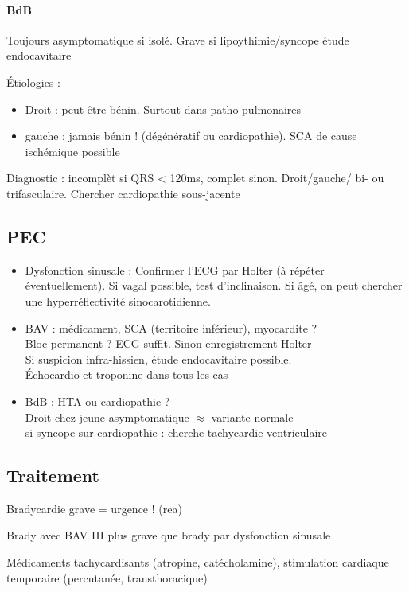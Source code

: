 \paragraph{BdB}
Toujours asymptomatique si isolé. Grave si lipoythimie/syncope \danger \thus
étude endocavitaire

Étiologies :
\begin{itemize}
  \item Droit : peut être bénin. Surtout dans patho pulmonaires
  \item gauche : jamais bénin ! (dégénératif ou cardiopathie). SCA de cause
    ischémique possible \skull
\end{itemize}

Diagnostic : incomplèt si QRS < 120ms, complet sinon. Droit/gauche/ bi- ou
trifasculaire. Chercher cardiopathie sous-jacente

\subsection{PEC}
\begin{itemize}
  \item 
Dysfonction sinusale : Confirmer l'ECG par Holter (à répéter éventuellement).
Si vagal possible, test d'inclinaison. Si âgé, on peut chercher une
hyperréflectivité sinocarotidienne.
\item BAV : médicament, SCA (territoire inférieur), myocardite ? \\
  Bloc permanent ? ECG suffit. Sinon enregistrement Holter \\
  Si suspicion infra-hissien, étude endocavitaire possible.\\
  Échocardio et troponine dans tous les cas
\item BdB : HTA ou cardiopathie ?\\
  Droit chez jeune asymptomatique $\approx$ variante normale\\
  si syncope sur cardiopathie : cherche tachycardie ventriculaire
\end{itemize}

\subsection{Traitement}
Bradycardie grave = urgence ! (rea) \skull

Brady avec BAV III plus grave que brady par dysfonction sinusale

Médicaments tachycardisants (atropine, catécholamine), stimulation cardiaque
temporaire (percutanée, transthoracique)

